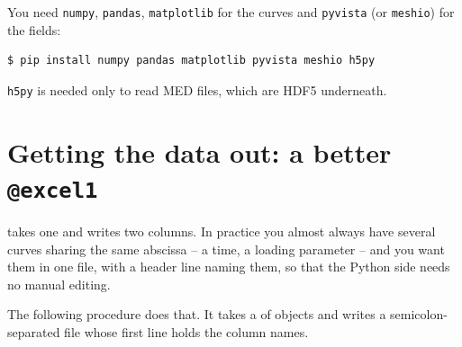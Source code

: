 \noindent You need \texttt{numpy}, \texttt{pandas}, \texttt{matplotlib} for
the curves and \texttt{pyvista} (or \texttt{meshio}) for the fields:

\begin{codebox}
\begin{verbatim}
$ pip install numpy pandas matplotlib pyvista meshio h5py
\end{verbatim}
\end{codebox}

\noindent \texttt{h5py} is needed only to read MED files, which are HDF5
underneath.

\section{Getting the data out: a better \texttt{@excel1}}
\label{sec:py:export}

 takes one  and writes two columns. In practice you
almost always have several curves sharing the same abscissa -- a time, a
loading parameter -- and you want them in one file, with a header line naming
them, so that the Python side needs no manual editing.

%
%
%
The following procedure does that. It takes a  of 
objects and writes a semicolon-separated file whose first line holds the
column names.

